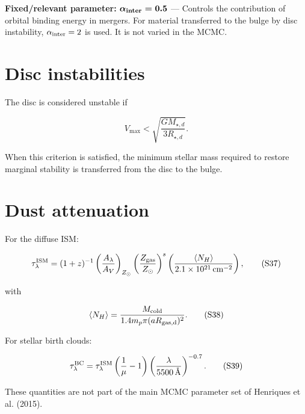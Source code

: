 \documentclass[11pt,a4paper]{article}
\newcommand{\fixedparam}[2]{%
  \colorbox{fixedgray}{\parbox{0.95\linewidth}{\textbf{Fixed/relevant parameter:} $\boldsymbol{#1}$ --- #2}}%
}
\begin{document}
\fixedparam{\alpha_{\rm inter}=0.5}{Controls the contribution of orbital binding energy in mergers. For material transferred to the bulge by disc instability, $\alpha_{\rm inter}=2$ is used. It is not varied in the MCMC.}

\section{Disc instabilities}
The disc is considered unstable if

\begin{equation}
 \boxed{V_{\max}<\sqrt{\frac{GM_{\star,d}}{3R_{\star,d}}}}.
 \tag{S35}
\end{equation}

When this criterion is satisfied, the minimum stellar mass required to restore marginal stability is transferred from the disc to the bulge.

\section{Dust attenuation}
For the diffuse ISM:

\begin{equation}
 \tau_\lambda^{\rm ISM}=(1+z)^{-1}
 \left(\frac{A_\lambda}{A_V}\right)_{Z_\odot}
 \left(\frac{Z_{\rm gas}}{Z_\odot}\right)^s
 \left(\frac{\langle N_H\rangle}{2.1\times10^{21}\,\mathrm{cm^{-2}}}\right),
 \tag{S37}
\end{equation}

with

\begin{equation}
 \langle N_H\rangle=\frac{M_{\rm cold}}
 {1.4m_p\pi(aR_{\rm gas,d})^2}.
 \tag{S38}
\end{equation}

For stellar birth clouds:

\begin{equation}
 \tau_\lambda^{\rm BC}=\tau_\lambda^{\rm ISM}
 \left(\frac{1}{\mu}-1\right)
 \left(\frac{\lambda}{5500\,\text{\AA}}\right)^{-0.7}.
 \tag{S39}
\end{equation}

These quantities are not part of the main MCMC parameter set of Henriques et al. (2015).

\newpage
\end{document}

